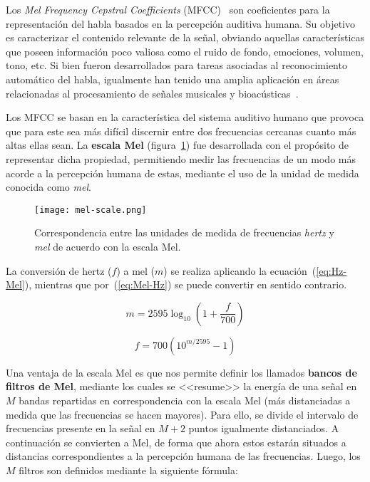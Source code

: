 Los \textit{Mel Frequency Cepstral Coefficients} (MFCC)~\cite{Davis80} son coeficientes para la representación del habla basados en la percepción auditiva humana.
Su objetivo es caracterizar el contenido relevante de la señal, obviando aquellas características que poseen información poco valiosa como el ruido de fondo, emociones, volumen, tono, etc.
Si bien fueron desarrollados para tareas asociadas al reconocimiento automático del habla, igualmente han tenido una amplia aplicación en áreas relacionadas al procesamiento de señales musicales y bioacústicas~\cite{McKinney03,Dufour14,Clemins05,Lee06,Li01,Cowling03,Mitrovic06,Fagerlund07}.

Los MFCC se basan en la característica del sistema auditivo humano que provoca que para este sea más difícil discernir entre dos frecuencias cercanas cuanto más altas ellas sean.
La \textbf{escala Mel} (figura~\ref{img:mel-scale}) fue desarrollada con el propósito de representar dicha propiedad, permitiendo medir las frecuencias de un modo más acorde a la percepción humana de estas, mediante el uso de la unidad de medida conocida como \textit{mel}.

\begin{figure}[!h]
    \centering
    \texttt{[image: mel-scale.png]}
    \caption{Correspondencia entre las unidades de medida de frecuencias \textit{hertz} y \textit{mel} de acuerdo con la escala Mel.}
    \label{img:mel-scale}
\end{figure}

La conversión de hertz ($f$) a mel ($m$) se realiza aplicando la ecuación~(\ref{eq:Hz-Mel}), mientras que por~(\ref{eq:Mel-Hz}) se puede convertir en sentido contrario.

\begin{equation}
    \label{eq:Hz-Mel}
    m = 2595\log_{10}\left( 1 + \frac{f}{700} \right)
\end{equation}

\begin{equation}
    \label{eq:Mel-Hz}
    f = 700\left( 10^{m/2595} - 1 \right)
\end{equation}

Una ventaja de la escala Mel es que nos permite definir los llamados \textbf{bancos de filtros de Mel}, mediante los cuales se <<resume>> la energía de una señal en $M$ bandas repartidas en correspondencia con la escala Mel (más distanciadas a medida que las frecuencias se hacen mayores).
Para ello, se divide el intervalo de frecuencias presente en la señal en $M+2$ puntos igualmente distanciados.
A continuación se convierten a Mel, de forma que ahora estos estarán situados a distancias correspondientes a la percepción humana de las frecuencias.
Luego, los $M$ filtros son definidos mediante la siguiente fórmula:

